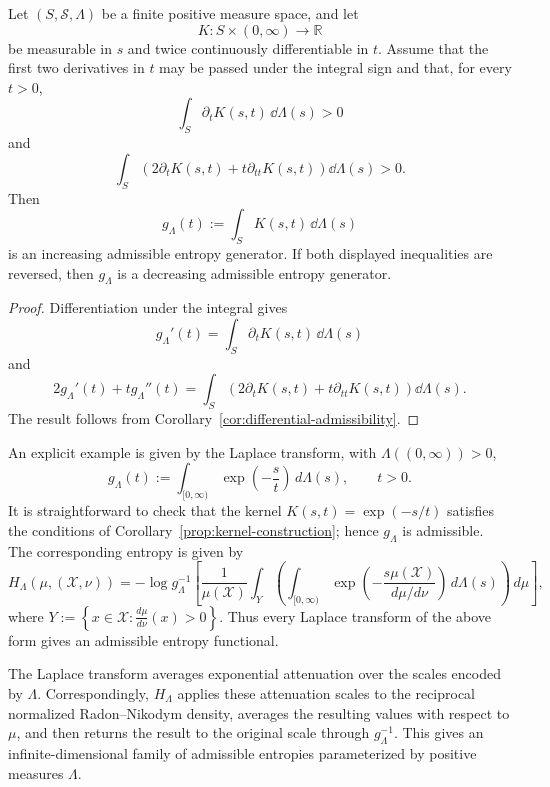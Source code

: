 \documentclass[reqno]{amsart}
\begin{document}
\begin{cor}
\label{prop:kernel-construction}
Let $(S,\mathcal{S},\Lambda)$ be a finite positive measure space, and let
$$
K:S\times(0,\infty)\longrightarrow\mathbb{R}
$$
be measurable in $s$ and twice continuously differentiable in $t$. Assume
that the first two derivatives in $t$ may be passed under the integral sign
and that, for every $t>0$,
$$
\int_S \partial_tK(s,t)\,\dd\Lambda(s)>0
$$
and
$$
\int_S
\left(
2\partial_tK(s,t)+t\partial_{tt}K(s,t)
\right)
\dd\Lambda(s)>0.
$$
Then
$$
g_\Lambda(t):=\int_S K(s,t)\,\dd\Lambda(s)
$$
is an increasing admissible entropy generator. If both displayed
inequalities are reversed, then $g_\Lambda$ is a decreasing admissible
entropy generator.
\end{cor}

\begin{proof}
Differentiation under the integral gives
$$
g_\Lambda'(t)
=
\int_S\partial_tK(s,t)\,\dd\Lambda(s)
$$
and
$$
2g_\Lambda'(t)+t g_\Lambda''(t)
=
\int_S
\left(
2\partial_tK(s,t)+t\partial_{tt}K(s,t)
\right)
\dd\Lambda(s).
$$
The result follows from
Corollary~\ref{cor:differential-admissibility}.
\end{proof}

An explicit example is given by the Laplace transform, with $\Lambda((0,\infty))>0$,
$$
g_{\Lambda}(t)
:=
\int_{[0,\infty)}
\exp\left(-\frac{s}{t}\right)
\,d\Lambda(s),
\qquad t>0.
$$
It is straightforward to check that the kernel
$K(s,t)=\exp(-s/t)$ satisfies the conditions of
Corollary~\ref{prop:kernel-construction}; hence $g_\Lambda$ is admissible. The corresponding entropy is given by
$$
H_{\Lambda}(\mu,(\mathcal{X},\nu))
=
-\log
g_{\Lambda}^{-1}
\left[
\frac{1}{\mu(\mathcal{X})}
\int_Y
\left(
\int_{[0,\infty)}
\exp\left(
-\frac{s\mu(\mathcal{X})}
{d\mu/d\nu}
\right)
\,d\Lambda(s)
\right)
\,d\mu
\right],
$$
where  $Y :=
\left\{
x\in\mathcal{X}:
\frac{d\mu}{d\nu}(x)>0
\right\}$. 
Thus every Laplace transform of the above form gives an admissible entropy functional.

The Laplace transform averages exponential attenuation over the scales encoded by $\Lambda$. Correspondingly, $H_{\Lambda}$ applies these
attenuation scales to the reciprocal normalized Radon--Nikodym density,
averages the resulting values with respect to $\mu$, and then returns the
result to the original scale through $g_{\Lambda}^{-1}$. This gives an
infinite-dimensional family of admissible entropies parameterized by
positive measures $\Lambda$.
\end{document}

